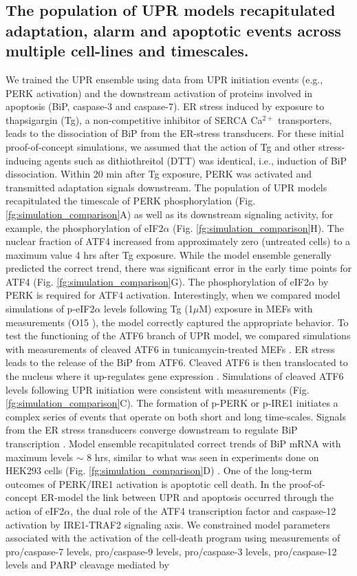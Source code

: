 \documentclass[fleqn,10pt]{wlscirep}
\begin{document}
\subsection*{The population of UPR models recapitulated adaptation, alarm and apoptotic events across multiple cell-lines and timescales.} 
We trained the UPR ensemble using data from UPR initiation events (e.g., PERK activation) and the downstream activation of proteins involved in apoptosis (BiP, caspase-3 and caspase-7). ER stress induced by exposure to thapsigargin (Tg), a non-competitive inhibitor of SERCA Ca$^{2+}$ transporters, leads to the dissociation of BiP from the ER-stress transducers. For these initial proof-of-concept simulations, we assumed that the action of Tg and other stress-inducing agents such as dithiothreitol (DTT) was identical, i.e., induction of BiP dissociation. Within 20 min after Tg exposure, PERK was activated and transmitted adaptation signals downstream. The population of UPR models recapitulated the timescale of PERK phosphorylation (Fig. \ref{fg:simulation_comparison}A) as well as its downstream signaling activity, for example, the phosphorylation of eIF2$\alpha$ (Fig. \ref{fg:simulation_comparison}H). The nuclear fraction of ATF4 increased from approximately zero (untreated cells) to a maximum value 4 hrs after Tg exposure. While the model ensemble generally predicted the correct trend, there was significant error in the early time points for ATF4 (Fig. \ref{fg:simulation_comparison}G). The phosphorylation of eIF2$\alpha$ by PERK is required for ATF4 activation. Interestingly, when we compared model simulations of p-eIF2$\alpha$ levels following Tg (1$\mu$M) exposure in MEFs with measurements (O15 \cite{yamamoto2007tim}), the model correctly captured the appropriate behavior. To test the functioning of the ATF6 branch of UPR model, we compared simulations with measurements of cleaved ATF6 in tunicamycin-treated MEFs \cite{lee2002imu}. ER stress leads to the release of the BiP from ATF6. Cleaved ATF6 is then translocated to the nucleus where it up-regulates gene expression \cite{silver1999mtf,hai1989tfa}. Simulations of cleaved ATF6 levels following UPR initiation were consistent with measurements (Fig. \ref{fg:simulation_comparison}C). The formation of p-PERK or p-IRE1 initiates a complex series of events that operate on both short and long time-scales. Signals from the ER stress transducers converge downstream to regulate BiP transcription \cite{malhotra2007era, rao2004mpe,kokame2001iei, yoshida2000aap}. Model ensemble recapitulated correct trends of BiP mRNA with maximum levels $\sim$ 8 hrs, similar to what was seen in experiments done on HEK293 cells (Fig. \ref{fg:simulation_comparison}D) \cite{lin2007ire1}. One of the long-term outcomes of PERK/IRE1 activation is apoptotic cell death. In the proof-of-concept ER-model the link between UPR and apoptosis occurred through the action of eIF2$\alpha$, the dual role of the ATF4 transcription factor and caspase-12 activation by IRE1-TRAF2 signaling axis. We constrained model parameters associated with the activation of the cell-death program using measurements of pro/caspase-7 levels, pro/caspase-9 levels, pro/caspase-3 levels, pro/caspase-12 levels and PARP cleavage mediated by 
\end{document}
